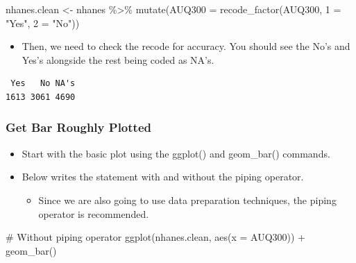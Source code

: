 \documentclass[
  letterpaper,
  DIV=11,
  numbers=noendperiod]{scrreprt}
\newenvironment{Shaded}{\begin{snugshade}}{\end{snugshade}}
\newcommand{\AttributeTok}[1]{\textcolor[rgb]{0.40,0.45,0.13}{#1}}
\newcommand{\CommentTok}[1]{\textcolor[rgb]{0.37,0.37,0.37}{#1}}
\newcommand{\FunctionTok}[1]{\textcolor[rgb]{0.28,0.35,0.67}{#1}}
\newcommand{\NormalTok}[1]{\textcolor[rgb]{0.00,0.23,0.31}{#1}}
\newcommand{\OtherTok}[1]{\textcolor[rgb]{0.00,0.23,0.31}{#1}}
\newcommand{\SpecialCharTok}[1]{\textcolor[rgb]{0.37,0.37,0.37}{#1}}
\newcommand{\StringTok}[1]{\textcolor[rgb]{0.13,0.47,0.30}{#1}}
\providecommand{\tightlist}{%
  \setlength{\itemsep}{0pt}\setlength{\parskip}{0pt}}\usepackage{longtable,booktabs,array}
\begin{document}
\begin{Shaded}
\begin{Highlighting}[]
\NormalTok{nhanes.clean }\OtherTok{\textless{}{-}}\NormalTok{ nhanes }\SpecialCharTok{\%\textgreater{}\%}
    \FunctionTok{mutate}\NormalTok{(}\AttributeTok{AUQ300 =} \FunctionTok{recode\_factor}\NormalTok{(AUQ300, }\StringTok{\textasciigrave{}}\AttributeTok{1}\StringTok{\textasciigrave{}} \OtherTok{=} \StringTok{"Yes"}\NormalTok{, }\StringTok{\textasciigrave{}}\AttributeTok{2}\StringTok{\textasciigrave{}} \OtherTok{=} \StringTok{"No"}\NormalTok{))}
\end{Highlighting}
\end{Shaded}

\begin{itemize}
\tightlist
\item
  Then, we need to check the recode for accuracy. You should see the
  No's and Yes's alongside the rest being coded as NA's.
\end{itemize}

\begin{Shaded}
\end{Shaded}

\begin{verbatim}
 Yes   No NA's 
1613 3061 4690 
\end{verbatim}

\subsubsection{Get Bar Roughly Plotted}\label{get-bar-roughly-plotted}

\begin{itemize}
\tightlist
\item
  Start with the basic plot using the ggplot() and geom\_bar() commands.
\item
  Below writes the statement with and without the piping operator.

  \begin{itemize}
  \tightlist
  \item
    Since we are also going to use data preparation techniques, the
    piping operator is recommended.
  \end{itemize}
\end{itemize}

\begin{Shaded}
\begin{Highlighting}[]
\CommentTok{\# Without piping operator}
\FunctionTok{ggplot}\NormalTok{(nhanes.clean, }\FunctionTok{aes}\NormalTok{(}\AttributeTok{x =}\NormalTok{ AUQ300)) }\SpecialCharTok{+} \FunctionTok{geom\_bar}\NormalTok{()}
\end{Highlighting}
\end{Shaded}
\end{document}
